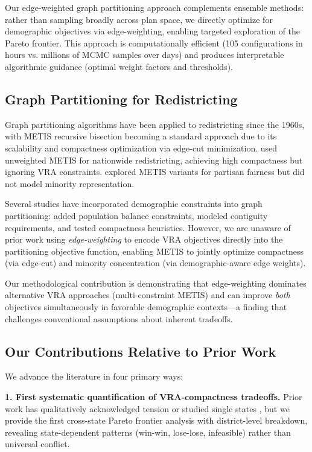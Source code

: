 Our edge-weighted graph partitioning approach complements ensemble methods: rather than sampling broadly across plan space, we directly optimize for demographic objectives via edge-weighting, enabling targeted exploration of the Pareto frontier. This approach is computationally efficient (105 configurations in hours vs. millions of MCMC samples over days) and produces interpretable algorithmic guidance (optimal weight factors and thresholds).

\subsection{Graph Partitioning for Redistricting}

Graph partitioning algorithms have been applied to redistricting since the 1960s, with METIS recursive bisection \citep{karypis1998} becoming a standard approach due to its scalability and compactness optimization via edge-cut minimization. \citet{levin2020} used unweighted METIS for nationwide redistricting, achieving high compactness but ignoring VRA constraints. \citet{king2022} explored METIS variants for partisan fairness but did not model minority representation.

Several studies have incorporated demographic constraints into graph partitioning: \citet{hess1965} added population balance constraints, \citet{garfinkel1970} modeled contiguity requirements, and \citet{macmillan1993} tested compactness heuristics. However, we are unaware of prior work using \emph{edge-weighting} to encode VRA objectives directly into the partitioning objective function, enabling METIS to jointly optimize compactness (via edge-cut) and minority concentration (via demographic-aware edge weights).

Our methodological contribution is demonstrating that edge-weighting dominates alternative VRA approaches (multi-constraint METIS) and can improve \emph{both} objectives simultaneously in favorable demographic contexts---a finding that challenges conventional assumptions about inherent tradeoffs.

\subsection{Our Contributions Relative to Prior Work}

We advance the literature in four primary ways:

\textbf{1. First systematic quantification of VRA-compactness tradeoffs.} Prior work has qualitatively acknowledged tension \citep{pildes1993,issacharoff2002} or studied single states \citep{mccartan2020}, but we provide the first cross-state Pareto frontier analysis with district-level breakdown, revealing state-dependent patterns (win-win, lose-lose, infeasible) rather than universal conflict.

